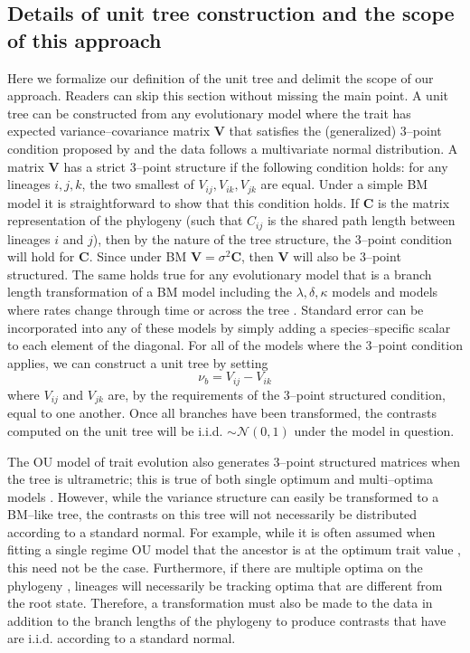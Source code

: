 \documentclass[a4paper,11pt]{article}
\begin{document}
\subsection{Details of unit tree construction and the scope of this approach}

Here we formalize our definition of the unit tree and delimit the scope of our approach. Readers can skip this section without missing the main point. A unit tree can be constructed from any evolutionary model where the trait has expected variance--covariance matrix $\mathbf{V}$ that satisfies the (generalized) 3--point condition proposed by \citet{Ho2014} and the data follows a multivariate normal distribution. A matrix $\mathbf{V}$ has a strict 3--point structure if the following condition holds: for any lineages $i,j,k$, the two smallest of $V_{ij}, V_{ik}, V_{jk}$ are equal. Under a simple BM model it is straightforward to show that this condition holds. If $\mathbf{C}$ is the matrix representation of the phylogeny (such that $C_{ij}$ is the shared path length between lineages $i$ and $j$), then by the nature of the tree structure, the 3--point condition will hold for $\mathbf{C}$. Since under BM $\mathbf{V}=\sigma^2\mathbf{C}$, then $\mathbf{V}$ will also be 3--point structured. The same holds true for any evolutionary model that is a branch length transformation of a BM model including the $\lambda, \delta, \kappa$ models \citep{Pagel1997,Pagel1999} and models where rates change through time \citep[the ``Early Burst'' or EB model, also referred to as the Accelerating/Decelerating Change, ACDC, model;][]{Blomberg2003, Harmon2010} or across the tree \citep{Omeara2006, Thomas2006, Eastman2011, Revell2012, motmot}. Standard error can be incorporated into any of these models by simply adding a species--specific scalar to each element of the diagonal. For all of the models where the 3--point condition applies, we can construct a unit tree by setting
\begin{equation}\label{eq:ut}
\nu_{b} = V_{ij} - V_{ik}
\end{equation}
where $V_{ij}$ and $V_{jk}$ are, by the requirements of the 3--point structured condition, equal to one another. Once all branches have been transformed, the contrasts computed on the unit tree will be i.i.d. $\sim \mathcal{N}(0,1)$ under the model in question. 

The OU model of trait evolution also generates 3--point structured matrices when the tree is ultrametric; this is true of both single optimum and multi--optima models \citep{Ho2014}.
However, while the variance structure can easily be transformed to a BM--like tree, the contrasts on this tree will not necessarily be distributed according to a standard normal. For example, while it is often assumed when fitting a single regime OU model that the ancestor is at the optimum trait value \citep[see, for example][]{Harmon2010}, this need not be the case. Furthermore, if there are multiple optima on the phylogeny \citep{Hansen1997, ButlerKing2004, IngramMahler2013, UyedaBayou}, lineages will necessarily be tracking optima that are different from the root state. Therefore, a transformation must also be made to the data in addition to the branch lengths of the phylogeny to produce contrasts that have are i.i.d. according to a standard normal.
\end{document}
